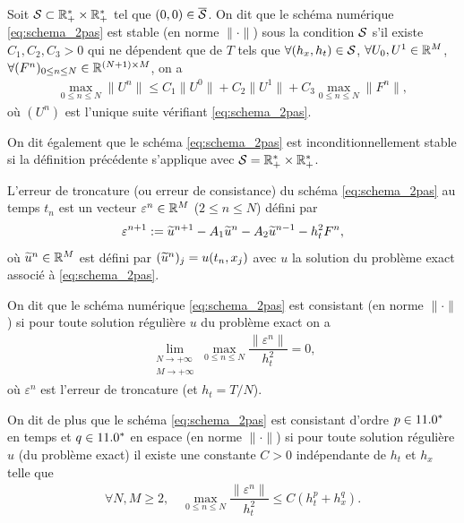 \documentclass[12pt,a4paper,twoside]{article}
\begin{document}
\begin{definition}
  \label{def:stabilite_2pas}
  Soit $\mathcal{S} \subset \mathbb{R}_+^* \times \mathbb{R}_+^*$ tel que $(0,0) \in \overline{\mathcal{S}}$.
  On dit que le sch\'ema num\'erique \eqref{eq:schema_2pas} est stable 
  (en norme $\|\cdot\|$)
  sous la condition $\mathcal{S}$ s'il existe $C_1 , C_2 , C_3 > 0$ qui ne d\'ependent que de $T$
  tels que $\forall (h_x , h_t) \in \mathcal{S}$, $\forall U_0 , U^1 \in \mathbb{R}^{M}$, 
  $\forall (F^n)_{0 \leq n \leq N} \in \mathbb{R}^{(N+1) \times M}$, on a
  \begin{align}
    \max_{0\leq n \leq N} \| U^n \| 
    \leq C_1 \| U^0 \| + C_2 \| U^1 \| 
    + C_3 \max_{0\leq n \leq N} \| F^n \| ,
  \end{align}
  o\`u $(U^n)$ est l'unique suite v\'erifiant \eqref{eq:schema_2pas}.

  On dit \'egalement que le sch\'ema \eqref{eq:schema_2pas} 
  est inconditionnellement stable
  si la d\'efinition pr\'ec\'edente
  s'applique avec $\mathcal{S} = \mathbb{R}_+^* \times \mathbb{R}_+^*$.
\end{definition}

\begin{definition}
  \label{def:troncature_2pas}
  L'erreur de troncature (ou erreur de consistance) du sch\'ema \eqref{eq:schema_2pas}
  au temps $t_n$ est un vecteur $\varepsilon^n \in \mathbb{R}^{M}$
  ($2 \leq n \leq N$)
  d\'efini par
  \begin{align}
    \label{eq:troncature_2pas}
    \varepsilon^{n+1} := \widetilde{u}^{n+1} - A_1 \widetilde{u}^n - A_2 \widetilde{u}^{n-1} - h_t^2 F^n ,
  \end{align}
  o\`u $\widetilde{u}^n \in \mathbb{R}^{M}$ est d\'efini par
  $(\widetilde{u}^n)_j = u(t_n,x_j)$ avec $u$ la solution du probl\`eme exact associ\'e \`a
  \eqref{eq:schema_2pas}.
\end{definition}

\begin{definition}
  \label{def:consistance_2pas}
  On dit que le sch\'ema num\'erique \eqref{eq:schema_2pas} est consistant 
  (en norme $\|\cdot\|$) si pour toute
  solution r\'eguli\`ere $u$ du probl\`eme exact on a
  \begin{align}
    \lim_{\substack{N \to +\infty\\ M \to +\infty}} \max_{0\leq n \leq N} 
    \dfrac{\| \varepsilon^n \|}{h_t^2} = 0 ,
  \end{align}
  o\`u $\varepsilon^n$ est l'erreur de troncature (et $h_t = T/N$).

  On dit de plus que le sch\'ema \eqref{eq:schema_2pas} est consistant d'ordre $p \in 11.0^*$
  en temps et $q \in 11.0^*$ en espace (en norme $\|\cdot\|$)
  si pour toute solution r\'eguli\`ere $u$ (du probl\`eme exact)
  il existe une constante $C>0$ ind\'ependante de $h_t$ et $h_x$ telle que
  \begin{align}
    \forall N, M \geq 2 , \quad \max_{0\leq n \leq N}
    \dfrac{\| \varepsilon^n \|}{h_t^2} \leq C (h_t^p + h_x^q) .
  \end{align}
\end{definition}
\end{document}
